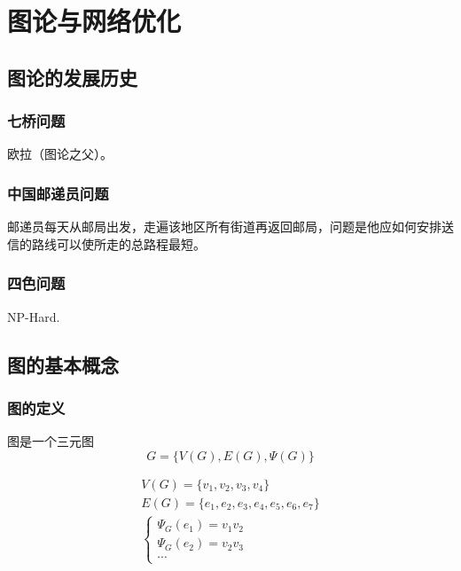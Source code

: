 \section{图论与网络优化}
\subsection{图论的发展历史}
\subsubsection{七桥问题}
欧拉（图论之父）。\par
{}
\subsubsection{中国邮递员问题}
邮递员每天从邮局出发，走遍该地区所有街道再返回邮局，问题是他应如何安排送信的路线可以使所走的总路程最短。
\subsubsection{四色问题}
NP-Hard.

\subsection{图的基本概念}
\subsubsection{图的定义}
图是一个三元图
$$
G=\{V(G),E(G),\Psi(G)\}
$$

\begin{align*}
V(G)=\{v_1,v_2,v_3,v_4\} \\
E(G)=\{e_1,e_2,e_3,e_4,e_5,e_6,e_7\} \\
\begin{cases}
\Psi_G(e_1)=v_1v_2 \\
\Psi_G(e_2)=v_2v_3 \\
\cdots
\end{cases}
\end{align*}
